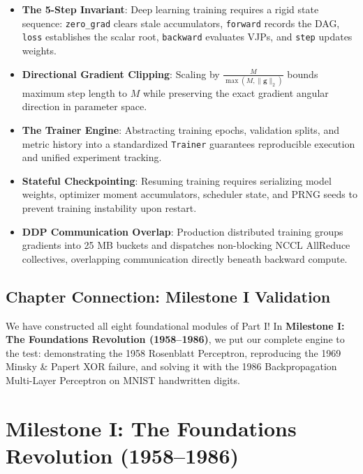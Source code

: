 \documentclass[
  letterpaper,
]{scrbook}
\providecommand{\tightlist}{%
  \setlength{\itemsep}{0pt}\setlength{\parskip}{0pt}}
\begin{document}
\begin{itemize}
\tightlist
\item
  \textbf{The 5-Step Invariant}: Deep learning training requires a rigid
  state sequence: \texttt{zero\_grad} clears stale accumulators,
  \texttt{forward} records the DAG, \texttt{loss} establishes the scalar
  root, \texttt{backward} evaluates VJPs, and \texttt{step} updates
  weights.
\item
  \textbf{Directional Gradient Clipping}: Scaling by
  \(\frac{M}{\max(M, \|\mathbf{g}\|_2)}\) bounds maximum step length to
  \(M\) while preserving the exact gradient angular direction in
  parameter space.
\item
  \textbf{The Trainer Engine}: Abstracting training epochs, validation
  splits, and metric history into a standardized \texttt{Trainer}
  guarantees reproducible execution and unified experiment tracking.
\item
  \textbf{Stateful Checkpointing}: Resuming training requires
  serializing model weights, optimizer moment accumulators, scheduler
  state, and PRNG seeds to prevent training instability upon restart.
\item
  \textbf{DDP Communication Overlap}: Production distributed training
  groups gradients into 25 MB buckets and dispatches non-blocking NCCL
  AllReduce collectives, overlapping communication directly beneath
  backward compute.
\end{itemize}

\section{Chapter Connection: Milestone I
Validation}\label{chapter-connection-milestone-i-validation}

We have constructed all eight foundational modules of Part I! In
\textbf{Milestone I: The Foundations Revolution (1958--1986)}, we put
our complete engine to the test: demonstrating the 1958 Rosenblatt
Perceptron, reproducing the 1969 Minsky \& Papert XOR failure, and
solving it with the 1986 Backpropagation Multi-Layer Perceptron on MNIST
handwritten digits.

\chapter*{Milestone I: The Foundations Revolution
(1958--1986)}\label{milestone-i-the-foundations-revolution-19581986}
\end{document}
